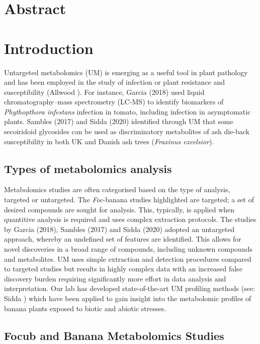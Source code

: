\section{Abstract}

\newpage
\section{Introduction}

Untargeted metabolomics (UM) is emerging as a useful tool in plant pathology and has been employed in the study of infection or plant resistance and susceptibility (Allwood ). For instance, Garcia \et (2018) used liquid chromatography–mass spectrometry (LC-MS) to identify biomarkers of \textit{Phythopthora infestans} infection in tomato, including infection in asymptomatic plants. Sambles \et  (2017) and Sidda \et (2020) identified through UM that some secoiridoid glycosides can be used as discriminatory metabolites of ash die-back susceptibility in both UK and Danish ash trees (\textit{Fraxinus excelsior}). 

\subsection{Types of metabolomics analysis}

Metabolomics studies are often categorised based on the type of analysis, targeted or untargeted. The \textit{Foc}-banana studies highlighted are targeted; a set of desired compounds are sought for analysis. This, typically, is applied when quantitive analysis is required and uses complex extraction protocols. The studies by Garcia \et (2018), Sambles \et  (2017) and Sidda \et (2020) adopted an untargeted approach, whereby an undefined set of features are identified. This allows for novel discoveries in a broad range of compounds, including unknown compounds and metabolites. UM uses simple extraction and detection procedures compared to targeted studies but results in highly complex data with an increased false discovery burden requiring significantly more effort in data analysis and interpretation. Our lab has developed state-of-the-art UM profiling methods (see: Sidda ) which have been applied to gain insight into the metabolomic profiles of banana plants exposed to biotic and abiotic stresses.

\subsection{\acl{Focub} and Banana Metabolomics Studies}

